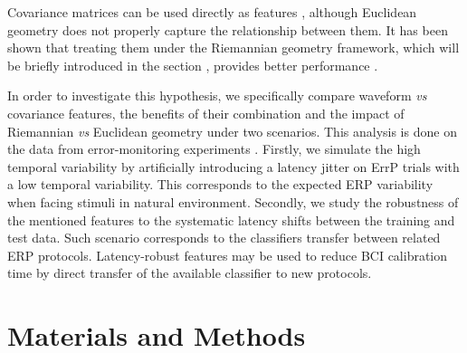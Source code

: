 \documentclass[12pt]{iopart}
\begin{document}
Covariance matrices can be used directly as features \cite{tomioka_classifying_2007}, 
although Euclidean geometry does not properly capture the relationship between them.
It has been shown that treating them under the Riemannian geometry framework,
which will be briefly introduced in the section ,
provides better performance \cite{barachant_classification_2013, zanini_transfer_2018}.


In order to investigate this hypothesis,
we specifically compare waveform \textit{vs} covariance features,
the benefits of their combination
and the impact of Riemannian \textit{vs} Euclidean geometry under two scenarios.
This analysis is done on the data from error-monitoring experiments \cite{iturrate_latency_2014-1}.
Firstly, we simulate the high temporal
variability by artificially introducing a latency jitter 
on ErrP trials with a low temporal variability.
This corresponds to the expected ERP variability when facing stimuli in
natural environment.
Secondly, we study the robustness of the mentioned features
to the systematic latency shifts between the training and test data. 
Such scenario corresponds to the classifiers transfer between
related ERP protocols. Latency-robust features may be used to reduce
BCI calibration time by direct transfer of the available classifier
to new protocols.







\section{Materials and Methods}
\label{sec:methods}
\end{document}
